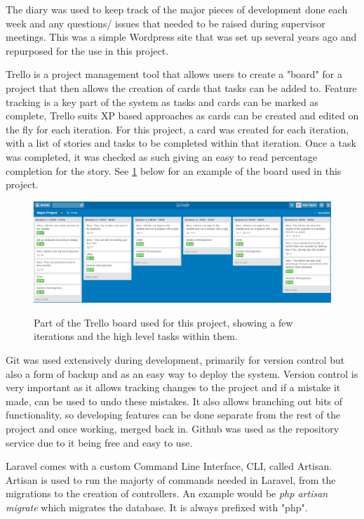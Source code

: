 The diary was used to keep track of the major pieces of development done each week and any questions/ issues that needed to be raised during supervisor meetings. This was a simple Wordpress site that was set up several years ago and repurposed for the use in this project.

Trello is a project management tool that allows users to create a "board" for a project that then allows the creation of cards that tasks can be added to\cite{trello}. Feature tracking is a key part of the system as tasks and cards can be marked as complete, Trello suits XP based approaches as cards can be created and edited on the fly for each iteration. For this project, a card was created for each iteration, with a list of stories and tasks to be completed within that iteration. Once a task was completed, it was checked as such giving an easy to read percentage completion for the story. See \ref{fig:trello-board} below for an example of the board used in this project.

\begin{figure}
	\caption{Part of the Trello board used for this project, showing a few iterations and the high level tasks within them.}
	\includegraphics[width=\textwidth]{Chapter2/trello-board}
	\label{fig:trello-board}
\end{figure}
\newpage

Git was used extensively during development, primarily for version control but also a form of backup and as an easy way to deploy the system. Version control is very important as it allows tracking changes to the project and if a mistake it made, can be used to undo these mistakes. It also allows branching out bits of functionality, so developing features can be done separate from the rest of the project and once working, merged back in. Github was used as the repository service due to it being free and easy to use\cite{github}.

Laravel comes with a custom Command Line Interface, CLI, called Artisan\cite{artisan}. Artisan is used to run the majorty of commands needed in Laravel, from the migrations to the creation of controllers. An example would be \textit{php artisan migrate} which migrates the database. It is always prefixed with "php".

